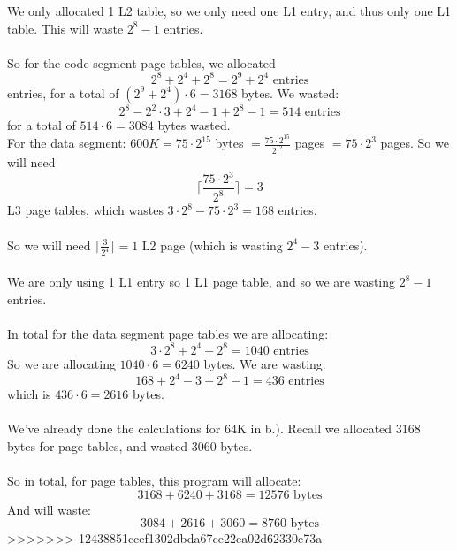 \documentclass{article}
\begin{document}
\begin{enumerate}[label=\alph*)]
We only allocated 1 L2 table, so we only need one L1 entry, and thus only one L1 table. This will waste $2^8 - 1$ entries. \\\\
So for the code segment page tables, we allocated
\[
2^8 + 2^4 + 2^8 = 2^9 + 2^4 \mbox{ entries}
\] entries, for a total of $(2^9 + 2^4) \cdot 6 = 3168$ bytes. We wasted: \\
\[
2^8 - 2^2 \cdot 3 + 2^4 - 1 + 2^8 - 1 = 514 \mbox { entries}
\]
for a total of $514 \cdot 6 = 3084$ bytes wasted. \\
For the data segment: $600K = 75 \cdot 2^{15}$ bytes $= \frac{75 \cdot 2^{15}}{2^12}$ pages $= 75 \cdot 2^3$ pages. So we will need \\
\[
\lceil\frac{75 \cdot 2^3}{2^8}\rceil = 3 
\]
L3 page tables, which wastes $3 \cdot 2^8 -75 \cdot 2^3  = 168$ entries. \\\\ So we will need $\lceil \frac{3}{2^4} \rceil = 1$ L2 page (which is wasting $2^4 - 3$ entries).\\\\ We are only using 1 L1 entry so 1 L1 page table, and so we are wasting $2^8 - 1$ entries. \\\\
In total for the data segment page tables we are allocating:\\
\[
3 \cdot 2^8 + 2^4 + 2^8 = 1040 \mbox{ entries}
\]
So we are allocating $1040 \cdot 6 = 6240$ bytes. We are wasting: \\
\[
168 + 2^4 - 3 + 2^8 - 1 = 436 \mbox{ entries}
\]
which is $436 \cdot 6 = 2616$ bytes. \\\\
We've already done the calculations for 64K in b.). Recall we allocated $3168$ bytes for page tables, and wasted $3060$ bytes. \\\\
So in total, for page tables, this program will allocate: \\
\[
3168 + 6240 + 3168 = 12576 \mbox{ bytes}
\] 
And will waste: \\
\[
3084 + 2616 + 3060 = 8760 \mbox{ bytes}
\]
>>>>>>> 12438851ccef1302dbda67ce22ea02d62330e73a
\end{enumerate}
\end{document}
